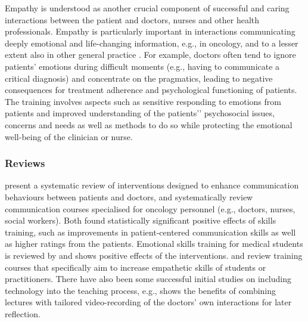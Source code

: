 \documentclass[prodmode,acmtochi]{acmsmall}
\newcommand{\todo}[1]{\textrm{\textrm{\textcolor{LightBlue}{[[#1]]} } } }
\newcommand{\GeraldineFIX}[1]{}
\begin{document}
Empathy is understood as another crucial component of successful and caring interactions between the patient and doctors, nurses and other health professionals. Empathy is particularly important in interactions communicating deeply emotional and life-changing information, e.g., in oncology, and to a lesser extent also in other general practice \cite{Barth2011}.
                For example, doctors often tend to ignore patients' emotions during difficult moments (e.g., having to communicate a critical diagnosis) and concentrate on the pragmatics, leading to negative consequences for treatment adherence and psychological functioning of patients. The training involves aspects such as sensitive responding to emotions from patients and improved understanding of the patients'’ psychosocial issues, concerns and needs as well as methods to do so while protecting the emotional well-being of the clinician or nurse. 


\GeraldineFIX{ G: say what technology how used in a sentence???}
\GeraldineFIX{ G: this doesn't seem to be empathy but about self awareness/regulation?  ... P: Is this a bit better? 
I'm drawing on the reviews and the concerns they use in this space -- in my reading it is also around objectification of the patient etc... where regulation is obviously important, but also as a part of being able to emphasise in these cases without burn-out etc. .. I think it might be too complex to go into details here (especially given what a tangled mess empathy as a concept is :)}

\subsubsection*{Reviews}  present a systematic review of interventions designed to enhance communication behaviours between patients and doctors, and  systematically review communication courses specialised for oncology personnel (e.g., doctors, nurses, social workers). Both  found statistically significant positive effects of skills training, such as improvements in patient-centered communication skills as well as higher ratings from the patients. Emotional skills training for medical students is reviewed by \cite{Satterfield2007} and shows positive effects of the interventions.  and  review training courses that specifically aim to increase empathetic skills of students or practitioners. There have also been some successful initial studies
on including technology into the teaching process, e.g., 
shows the benefits of combining lectures with tailored video-recording of
the doctors' own interactions for later reflection.
\end{document}
